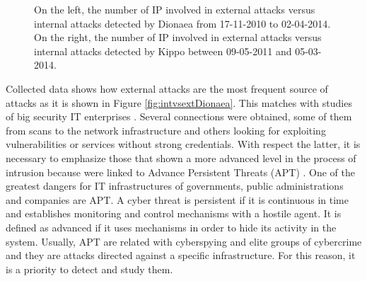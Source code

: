 \documentclass[a4paper]{llncs}
\begin{document}
\begin{figure}[h]
	\caption{On the left, the number of IP involved in external attacks versus internal attacks detected by Dionaea from 17-11-2010 to 02-04-2014. On the right, the number of IP involved in external attacks versus internal attacks detected by Kippo between 09-05-2011 and 05-03-2014.\label{fig:intvsextDionaea}\label{fig:intvsextKippo}}
\end{figure}

Collected data shows how external attacks are the most frequent source of attacks as it is shown in Figure \ref{fig:intvsextDionaea}. This matches with studies of big security IT enterprises \cite{verizon-2015}. Several connections were obtained, some of them from scans to the network infrastructure and others looking for exploiting vulnerabilities or services without strong credentials. With respect the latter, it is necessary to emphasize those that shown a more advanced level in the process of intrusion because were linked to Advance Persistent Threats (APT) \cite{Sood&Enbody2013}. One of the greatest dangers for IT infrastructures of governments, public administrations and companies are APT. A cyber threat is persistent if it is continuous in time and establishes monitoring and control mechanisms with a hostile agent. It is defined as advanced if it uses mechanisms in order to hide its activity in the system. Usually, APT are related with cyberspying and elite groups of cybercrime and they are attacks directed against a specific infrastructure. For this reason, it is a priority to detect and study them.
\end{document}
